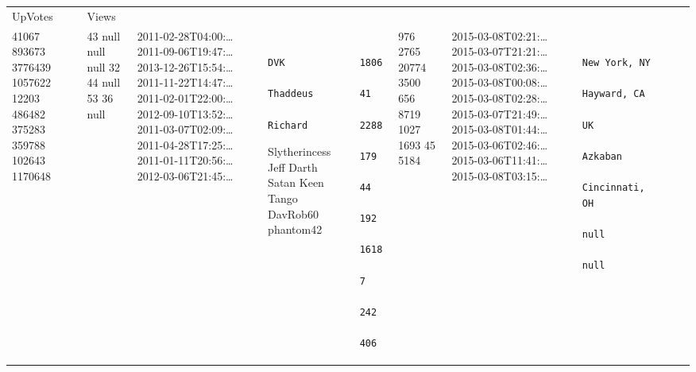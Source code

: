 \documentclass[12pt,a4paper,twoside,openright,titlepage,final]{article}
\begin{document}
\begin{enumerate}
\begin{longtable}[]{@{}lllllllllll@{}}
\begin{minipage}[t]{0.04\columnwidth}
			UpVotes
			\strut\end{minipage} &
		\begin{minipage}[t]{0.04\columnwidth}\raggedright\strut
			Views
			\strut\end{minipage}\tabularnewline
		\begin{minipage}[t]{0.05\columnwidth}\raggedright\strut
			41067 893673 3776439 1057622 12203 486482 375283 359788 102643 1170648
			\strut\end{minipage} &
		\begin{minipage}[t]{0.03\columnwidth}\raggedright\strut
			43 null null null 32 44 null 53 36 null
			\strut\end{minipage} &
		\begin{minipage}[t]{0.11\columnwidth}\raggedright\strut
			2011-02-28T04:00:\ldots{} 2011-09-06T19:47:\ldots{}
			2013-12-26T15:54:\ldots{} 2011-11-22T14:47:\ldots{}
			2011-02-01T22:00:\ldots{} 2012-09-10T13:52:\ldots{}
			2011-03-07T02:09:\ldots{} 2011-04-28T17:25:\ldots{}
			2011-01-11T20:56:\ldots{} 2012-03-06T21:45:\ldots{}
			\strut\end{minipage} &
		\begin{minipage}[t]{0.07\columnwidth}\raggedright\strut
			\begin{verbatim}
			DVK
			Thaddeus
			Richard
			\end{verbatim}
			
			Slytherincess Jeff Darth Satan Keen Tango DavRob60 phantom42
			\strut\end{minipage} &
		\begin{minipage}[t]{0.05\columnwidth}\raggedright\strut
			\begin{verbatim}
			1806
			41
			2288
			179
			44
			192
			1618
			7
			242
			406
			\end{verbatim}
			\strut\end{minipage} &
		\begin{minipage}[t]{0.03\columnwidth}\raggedright\strut
			976 2765 20774 3500 656 8719 1027 1693 45 5184
			\strut\end{minipage} &
		\begin{minipage}[t]{0.11\columnwidth}\raggedright\strut
			2015-03-08T02:21:\ldots{} 2015-03-07T21:21:\ldots{}
			2015-03-08T02:36:\ldots{} 2015-03-08T00:08:\ldots{}
			2015-03-08T02:28:\ldots{} 2015-03-07T21:49:\ldots{}
			2015-03-08T01:44:\ldots{} 2015-03-06T02:46:\ldots{}
			2015-03-06T11:41:\ldots{} 2015-03-08T03:15:\ldots{}
			\strut\end{minipage} &
		\begin{minipage}[t]{0.11\columnwidth}\raggedright\strut
			\begin{verbatim}
			New York, NY
			Hayward, CA
			UK
			Azkaban
			Cincinnati, OH
			null
			null
			\end{verbatim}
			

\end{minipage}
\end{longtable}
\end{enumerate}
\end{document}
